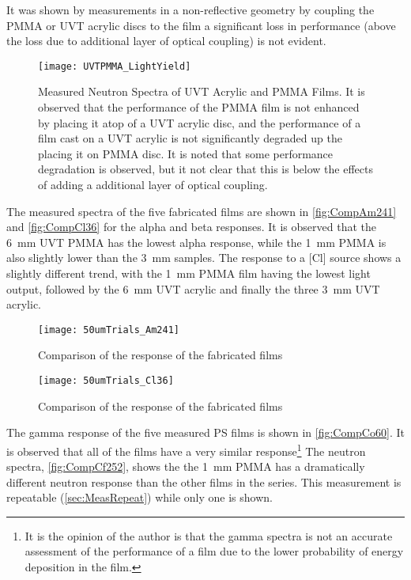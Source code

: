 \documentclass[draftcls,onecolumn]{IEEEtran}
\begin{document}
It was shown by measurements in a non-reflective geometry by coupling the PMMA or UVT acrylic discs to the film a significant loss in performance (above the loss due to additional layer of optical coupling) is not evident.
\begin{figure}
  \centering
  \texttt{[image: UVTPMMA\_LightYield]}
  \caption[Measured Effect of UVT acrylic and PMMA]{Measured Neutron Spectra of UVT Acrylic and PMMA Films. It is observed that the performance of the PMMA film is not enhanced by placing it atop of a UVT acrylic disc, and the performance of a film cast on a UVT acrylic is not significantly degraded up the placing it on PMMA disc. It is noted that some performance degradation is observed, but it not clear that this is below the effects of adding a additional layer of optical coupling.}
  \label{fig:RadMeasuredExper}
\end{figure}
The measured spectra of the five fabricated films are shown in \autoref{fig:CompAm241} and \autoref{fig:CompCl36} for the alpha and beta responses.
It is observed that the \SI{6}{\mm} UVT PMMA has the lowest alpha response, while the \SI{1}{\mm} PMMA is also slightly lower than the \SI{3}{\mm} samples.
The response to a [Cl] source shows a slightly different trend, with the \SI{1}{\mm} PMMA film having the lowest light output, followed by the \SI{6}{\mm} UVT acrylic and finally the three \SI{3}{\mm} UVT acrylic.
\begin{figure}[ht]
  \centering
  \texttt{[image: 50umTrials\_Am241]}
  \caption[Fabricated Film Comparison (Alpha)]{Comparison of the  response of the fabricated films}
  \label{fig:CompAm241}
\end{figure}
\begin{figure}[ht]
  \centering
  \texttt{[image: 50umTrials\_Cl36]}
  \caption[Fabricated Film Comparison (Beta)]{Comparison of the  response of the fabricated films}
  \label{fig:CompCl36}
\end{figure}
The gamma response of the five measured PS films is shown in \autoref{fig:CompCo60}.
It is observed that all of the films have a very similar response\footnote{It is the opinion of the author is that the gamma spectra is not an accurate assessment of the performance of a film due to the lower probability of energy deposition in the film.}
The neutron spectra, \autoref{fig:CompCf252}, shows the the \SI{1}{\mm} PMMA has a dramatically different neutron response than the other films in the series.
This measurement is repeatable (\autoref{sec:MeasRepeat}) while only one is shown.
\end{document}
